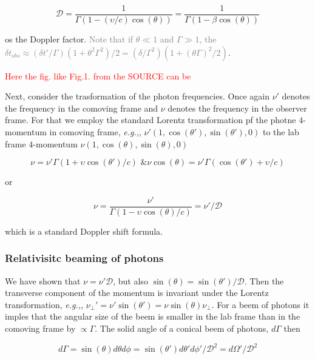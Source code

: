 \documentclass[11pt,a4paper,headinclude=true,DIV=14,BCOR=8mm,chapterprefix,listof=totoc,twoside,openright,abstracton]{scrbook}
\newcommand{\red}[1]{\textcolor{red}{#1}}
\newcommand{\gray}[1]{\textcolor{gray}{#1}}
\begin{document}
\begin{equation}
    \mathcal{D} = \frac{1}{\Gamma(1 - (\upsilon/c) \cos(\theta))} = \frac{1}{\Gamma(1 - \beta\cos(\theta))}
\end{equation}

os the Doppler factor. 
\gray{Note that if $\theta \ll 1$ and $\Gamma \gg 1$, the $\delta t_{obs} \approx (\delta t' / \Gamma) (1 + \theta^2 \Gamma^2)/2 = (\delta/\Gamma^2)(1 + (\theta\Gamma)^2/2)$}.

\red{Here the fig. like Fig.1. from the SOURCE can be}

Next, consider the trasformation of the photon frequencies. Once again $\nu'$ denotes the frequency in the comoving frame and $\nu$ denotes the frequency in the observer frame. For that we employ the standard Lorentz transformation pf the photne $4$-momentum in comoving frame, \textit{e.g.,}, $\nu'(1, \cos(\theta'), \sin(\theta'),0)$ to the lab frame $4$-momentum $\nu(1, \cos(\theta), \sin(\theta), 0)$

\begin{equation}
    \nu = \nu' \Gamma(1+\upsilon \cos(\theta')/c) \text{ \& } \nu\cos(\theta) = \nu' \Gamma (\cos(\theta') + \upsilon/c)
\end{equation}

or 

\begin{equation}
    \nu = \frac{\nu'}{\Gamma (1 - \upsilon\cos(\theta)/c)} = \nu' / \mathcal{D}
\end{equation}

which is a standard Doppler shift formula.


\subsubsection{Relativisitc beaming of photons}

We have shown that $\nu = \nu' \mathcal{D}$, but also $\sin(\theta) = \sin(\theta')/\mathcal{D}$. Then the transverse component of the momentum is invariant under the Lorentz transformation, \textit{e.g.,}, $\nu_{\perp}' = \nu'\sin(\theta') = \nu\sin(\theta) \nu_{\perp}$. 
For a beem of photons it imples that the angular size of the beem is smaller in the lab frame than in the comoving frame by $\propto \Gamma$.
The solid angle of a conical beem of photons, $d\Gamma$ then 

\begin{equation}
    d\Gamma = \sin(\theta)d\theta d\phi = \sin(\theta') d\theta' d\phi' / \mathcal{D}^2 = d\Omega'/\mathcal{D}^2
\end{equation}
\end{document}

